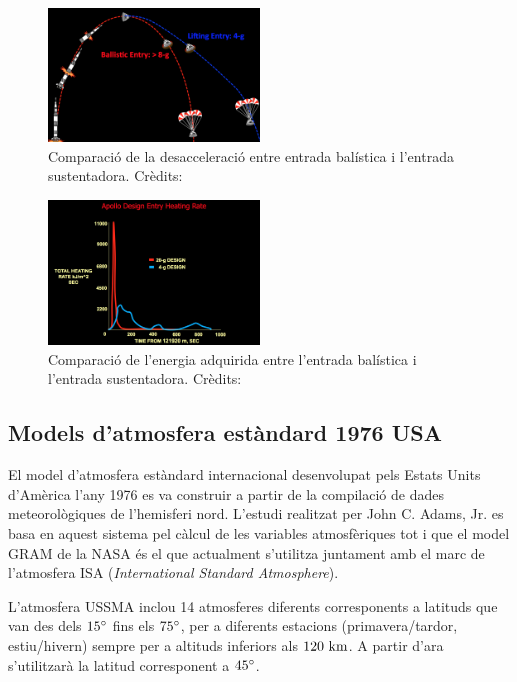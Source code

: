 \begin{figure}[ht]
    \centering
    \includegraphics[width=0.5\textwidth]{imagenes/00_general/ballistic_vs_lifting.png}
    \captionsetup{width=0.6\textwidth}
    \caption{Comparació de la desacceleració entre entrada balística i l'entrada sustentadora. Crèdits: \cite{robert_frost}}
    \label{fig:ballistic_vs_lifting}
\end{figure}

\begin{figure}[ht]
    \centering
    \includegraphics[width=0.5\textwidth]{imagenes/00_general/heating_ballistic_vs_lifting.png}
    \captionsetup{width=0.6\textwidth}
    \caption{Comparació de l'energia adquirida entre l'entrada balística i l'entrada sustentadora. Crèdits: \cite{robert_frost}}
    \label{fig:heating_ballistic_vs_lifting}
\end{figure}


\newpage
\subsection{Models d'atmosfera estàndard 1976 USA}
El model d'atmosfera estàndard internacional desenvolupat pels Estats Units d'Amèrica l'any 1976 es va construir a partir de la compilació de dades meteorològiques de l'hemisferi nord. L'estudi realitzat per John C. Adams, Jr. es basa en aquest sistema pel càlcul de les variables atmosfèriques tot i que el model GRAM de la NASA és el que actualment s'utilitza juntament amb el marc de l'atmosfera ISA (\emph{International Standard Atmosphere}). 

L'atmosfera USSMA inclou 14 atmosferes diferents corresponents a latituds que van des dels $15\degrees$ fins els $75\degrees$, per a diferents estacions (primavera/tardor, estiu/hivern) sempre per a altituds inferiors als $120 \ \kilo\meter$. A partir d'ara s'utilitzarà la latitud corresponent a $45\degrees$.

